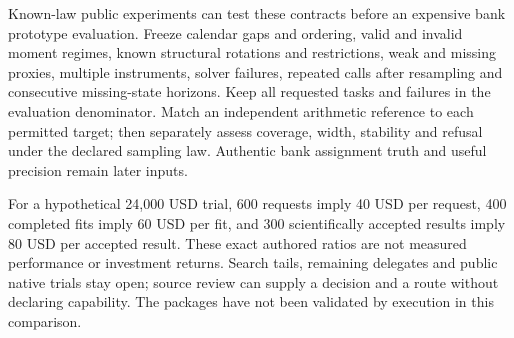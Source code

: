 Known-law public experiments can test these contracts before an expensive bank prototype evaluation. Freeze calendar gaps and ordering, valid and invalid moment regimes, known structural rotations and restrictions, weak and missing proxies, multiple instruments, solver failures, repeated calls after resampling and consecutive missing-state horizons. Keep all requested tasks and failures in the evaluation denominator. Match an independent arithmetic reference to each permitted target; then separately assess coverage, width, stability and refusal under the declared sampling law. Authentic bank assignment truth and useful precision remain later inputs.

For a hypothetical 24,000 USD trial, 600 requests imply 40 USD per request, 400 completed fits imply 60 USD per fit, and 300 scientifically accepted results imply 80 USD per accepted result. These exact authored ratios are not measured performance or investment returns. Search tails, remaining delegates and public native trials stay open; source review can supply a decision and a route without declaring capability. The packages have not been validated by execution in this comparison.~\citep{exec25_pydyn_choice}
